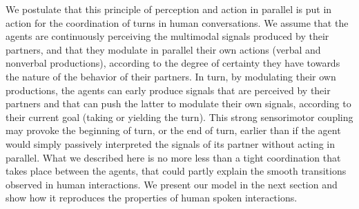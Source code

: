 
We postulate that this principle of perception and action in parallel is put in action for the coordination of turns in human conversations. We assume that the agents are continuously perceiving the multimodal signals produced by their partners, and that they modulate in parallel their own actions (verbal and nonverbal productions), according to the degree of certainty they have towards the nature of the behavior of their partners. 
In turn, by modulating their own productions, the agents can early produce signals that are perceived by their partners and that can push the latter to modulate their own signals, according to their current goal (taking or yielding the turn). This strong sensorimotor coupling may provoke the beginning of turn, or the end of turn, earlier than if the agent would simply passively interpreted the signals of its partner without acting in parallel. What we described here is no more less than a tight coordination that takes place between the agents, that could partly explain the smooth transitions observed in human interactions. We present our model in the next section and show how it reproduces the properties of human spoken interactions. 
